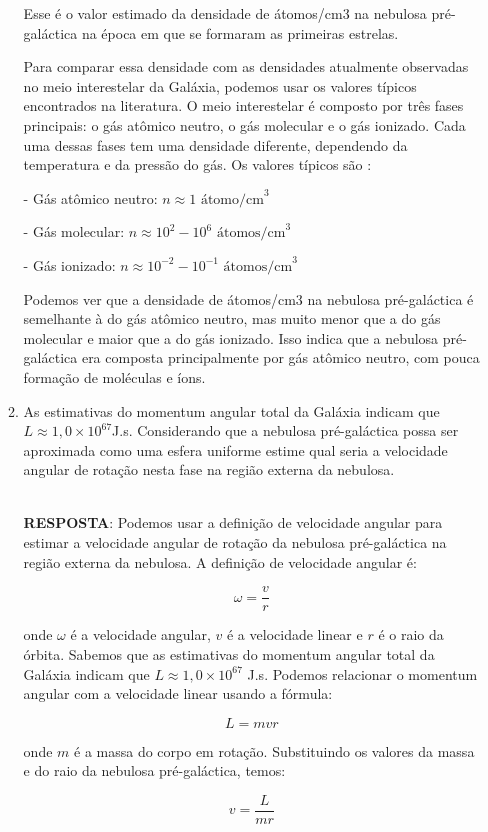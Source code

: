 \documentclass[a4paper,12pt]{article}
\begin{document}
\begin{enumerate}
\begin{enumerate}
Esse é o valor estimado da densidade de átomos/cm3 na nebulosa pré-galáctica na época em que se formaram as primeiras estrelas.

Para comparar essa densidade com as densidades atualmente observadas no meio interestelar da Galáxia, podemos usar os valores típicos encontrados na literatura. O meio interestelar é composto por três fases principais: o gás atômico neutro, o gás molecular e o gás ionizado. Cada uma dessas fases tem uma densidade diferente, dependendo da temperatura e da pressão do gás. Os valores típicos são :

- Gás atômico neutro: $n \approx 1 \text{ átomo/cm}^3$

- Gás molecular: $n \approx 10^2 - 10^6 \text{ átomos/cm}^3$

- Gás ionizado: $n \approx 10^{-2} - 10^{-1} \text{ átomos/cm}^3$

Podemos ver que a densidade de átomos/cm3 na nebulosa pré-galáctica é semelhante à do gás atômico neutro, mas muito menor que a do gás molecular e maior que a do gás ionizado. Isso indica que a nebulosa pré-galáctica era composta principalmente por gás atômico neutro, com pouca formação de moléculas e íons.

\noindent\hrulefill

\item As estimativas do momentum angular total da Galáxia indicam que 
$L\approx 1,0\times 10^{67}$J.s. Considerando que a nebulosa pré-galáctica possa ser aproximada como uma esfera uniforme estime qual seria a velocidade angular de rotação nesta fase na região externa da nebulosa.

\noindent\hrulefill\\\textbf{RESPOSTA}: Podemos usar a definição de velocidade angular para estimar a velocidade angular de rotação da nebulosa pré-galáctica na região externa da nebulosa. A definição de velocidade angular é:

$$\omega = \frac{v}{r}$$

onde $\omega$ é a velocidade angular, $v$ é a velocidade linear e $r$ é o raio da órbita. Sabemos que as estimativas do momentum angular total da Galáxia indicam que $L \approx 1,0 \times 10^{67}$ J.s. Podemos relacionar o momentum angular com a velocidade linear usando a fórmula:

$$L = mvr$$

onde $m$ é a massa do corpo em rotação. Substituindo os valores da massa e do raio da nebulosa pré-galáctica, temos:

$$v = \frac{L}{mr}$$


\end{enumerate}
\end{enumerate}
\end{document}
